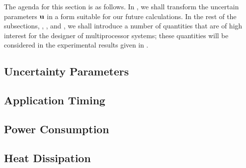 The agenda for this section is as follows. In , we
shall transform the uncertain parameters $\mathbf{u}$ in a form suitable for our future
calculations. In the rest of the subsections, ,
, and , we shall introduce a
number of quantities that are of high interest for the designer of
multiprocessor systems; these quantities will be considered in the experimental
results given in .

\subsection{Uncertainty Parameters} 


\subsection{Application Timing} 


\subsection{Power Consumption} 


\subsection{Heat Dissipation} 

